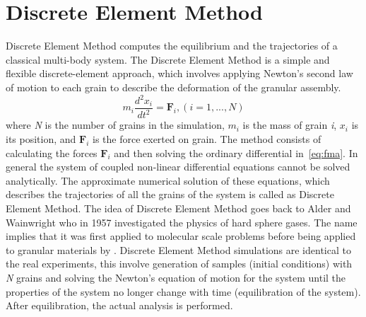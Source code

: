  
\section{Discrete Element Method}

Discrete Element Method computes the equilibrium and the trajectories of a 
classical 
multi-body system. The Discrete Element Method is a simple and flexible 
discrete-element 
approach, which involves applying Newton's second law of motion to each grain 
to describe the 
deformation of the granular assembly.  
\begin{equation} 
  {m}_{i}\frac{{{d}^{2}}{{x}_{i}}}{d{{t}^{2}}} = {{\mathbf{F}}_{i}}, 
(i=1,...,N 
  )
 \label{eq:fma}
\end{equation}
%
where \textit{N} is the number of grains in the simulation, $m_{\mathit{i}}$ 
is 
the mass of grain 
\textit{i}, $x_{\mathit{i}}$ is its position, and $\mathbf{F}_{\mathit{i}}$ is 
the force exerted 
on 
grain. The method consists of calculating the forces $\mathbf{F}_{\mathit{i}}$ 
and then solving 
the 
ordinary differential in~\cref{eq:fma}. In general the system of coupled 
non-linear 
differential equations cannot be solved analytically. The approximate 
numerical 
solution of these 
equations, which describes the trajectories of all the grains of the system 
is called as 
Discrete Element Method. The idea of Discrete Element Method goes back to 
Alder 
and Wainwright who 
in 1957 
investigated the physics of hard sphere gases. The name implies that it was 
first applied to 
molecular scale problems before being applied to granular materials by 
\citet{Cundall1979}. 
Discrete Element Method simulations are identical to the real experiments, 
this 
involve generation 
of 
samples (initial conditions) with \textit{N} grains and solving the 
Newton's 
equation of motion 
for the system until the properties of the system no longer change with time 
(equilibration of the 
system). After equilibration, the actual analysis is performed.

